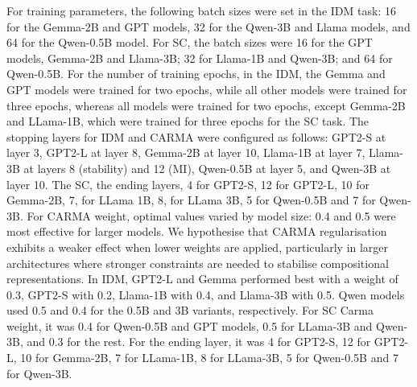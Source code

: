 For training parameters, the following batch sizes were set in the IDM task: 16 for the Gemma-2B and GPT models, 32 for the Qwen-3B and Llama models, and 64 for the Qwen-0.5B model. For SC, the batch sizes were 16 for the GPT models, Gemma-2B and Llama-3B; 32 for Llama-1B and Qwen-3B; and 64 for Qwen-0.5B. For the number of training epochs, in the IDM, the Gemma and GPT models were trained for two epochs, while all other models were trained for three epochs, whereas all models were trained for two epochs, except Gemma-2B and LLama-1B, which were trained for three epochs for the SC task. The stopping layers for IDM and CARMA were configured as follows: GPT2-S at layer 3, GPT2-L at layer 8, Gemma-2B at layer 10, Llama-1B at layer 7, Llama-3B at layers 8 (stability) and 12 (MI), Qwen-0.5B at layer 5, and Qwen-3B at layer 10. The SC, the ending layers, 4 for GPT2-S, 12 for GPT2-L, 10 for Gemma-2B, 7, for LLama 1B, 8, for LLama 3B, 5 for Qwen-0.5B and 7 for Qwen-3B. For CARMA weight, optimal values varied by model size: 0.4 and 0.5 were most effective for larger models. We hypothesise that CARMA regularisation exhibits a weaker effect when lower weights are applied, particularly in larger architectures where stronger constraints are needed to stabilise compositional representations. In IDM, GPT2-L and Gemma performed best with a weight of 0.3, GPT2-S with 0.2, Llama-1B with 0.4, and Llama-3B with 0.5. Qwen models used 0.5 and 0.4 for the 0.5B and 3B variants, respectively. For SC Carma weight, it was 0.4 for Qwen-0.5B and GPT models, 0.5 for LLama-3B and Qwen-3B, and 0.3 for the rest. For the ending layer, it was 4 for GPT2-S, 12 for GPT2-L, 10 for Gemma-2B, 7 for LLama-1B, 8 for LLama-3B, 5 for Qwen-0.5B and 7 for Qwen-3B. 


